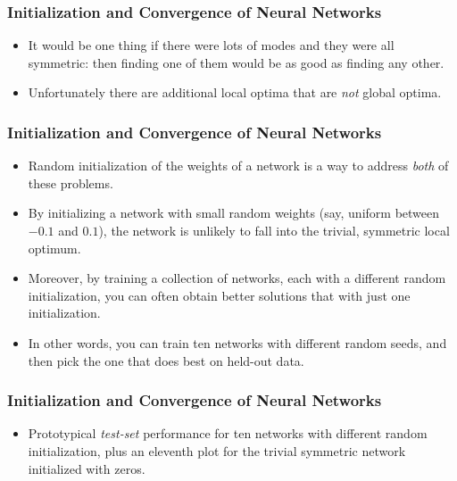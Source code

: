 \documentclass[trans]{beamer}
\begin{document}
\begin{frame}
  \frametitle{Initialization and Convergence of Neural Networks}
\begin{itemize}
\item  It would be one thing if there were lots of modes
and they were all symmetric: then finding one of them would be as good
as finding any other.
\item  Unfortunately there are additional local
optima that are \emph{not} global optima.
\end{itemize}
\end{frame}

\begin{frame}
  \frametitle{Initialization and Convergence of Neural Networks}
\begin{itemize}
\item
Random initialization of the weights of a network is a way to address
\emph{both} of these problems.  
\item By initializing a network with small
random weights (say, uniform between $-0.1$ and $0.1$), the network is
unlikely to fall into the trivial, symmetric local optimum.  
\item Moreover,
by training a collection of networks, each with a different random
initialization, you can often obtain better solutions that with just
one initialization. 
\item In other words, you can train ten networks with
different random seeds, and then pick the one that does best on
held-out data. 
\end{itemize}
\end{frame}

\begin{frame}
  \frametitle{Initialization and Convergence of Neural Networks}
\begin{itemize}
\item
Prototypical
\emph{test-set} performance for ten networks with different random
initialization, plus an eleventh plot for the trivial symmetric
network initialized with zeros.
\end{itemize}
\end{frame}
\end{document}
